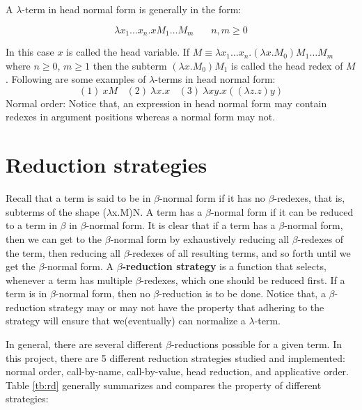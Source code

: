 \noindent A $\lambda$-term in head normal form is generally in the form:

\begin{equation*}
\lambda x_1\ldots x_n.xM_1\ldots M_m\ \ \ \ \ \ \ \ n,m\geqslant 0
\end{equation*}

In this case $x$ is called the head variable. If $M \equiv \lambda x_1\ldots x_n.(\lambda x.M_0)M_1\ldots M_m$ where $n\geqslant 0$, $m\geqslant 1$ then the subterm $(\lambda x.M_0)M_1$ is called the head redex of $M$. Following are some examples of $\lambda$-terms in head normal form:
\begin{equation*}
(1)\ xM\ \ \ \ (2)\ \lambda x.x\ \ \ \ (3)\ \lambda xy.x((\lambda z.z)y)
\end{equation*}Normal order:
Notice that, an expression in head normal form may contain redexes in argument positions whereas a normal form may not.


\section{Reduction strategies}\label{sec:reductionstrategy}
\noindent Recall that a term is said to be in $\beta$-normal form if it has no $\beta$-redexes, that is, subterms of the shape ($\lambda$x.M)N. A term has a $\beta$-normal form if it can be reduced to a term in $\beta$ in $\beta$-normal form. It is clear that if a term has a $\beta$-normal form, then we can get to the $\beta$-normal form by exhaustively reducing all $\beta$-redexes of the term, then reducing all $\beta$-redexes of all resulting terms, and so forth until we get the $\beta$-normal form. A \textbf{$\beta$-reduction strategy} is a function that selects, whenever a term has multiple $\beta$-redexes, which one should be reduced first. If a term is in $\beta$-normal form, then no $\beta$-reduction is to be done. Notice that, a $\beta$-reduction strategy may or may not have the property that adhering to the strategy will ensure that we(eventually) can normalize a $\lambda$-term. 

In general, there are several different $\beta$-reductions possible for a given term. In this project, there are 5 different reduction strategies studied and implemented: normal order, call-by-name, call-by-value, head reduction, and applicative order. Table \ref{tb:rd} generally summarizes and compares the property of different strategies:
 
